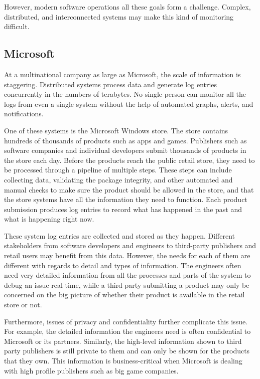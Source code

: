 \documentclass[english,12pt,a4paper,pdftex,sci,utf8]{aaltothesis}
\theoremstyle{definition}
\begin{document}
However, modern software operations all these goals form a challenge.
Complex, distributed, and interconnected systems may make this kind of monitoring difficult.

\subsection{Microsoft}
At a multinational company as large as Microsoft, the scale of information is staggering.
Distributed systems process data and generate log entries concurrently in the numbers of terabytes.
No single person can monitor all the logs from even a single system without the help of automated
graphs, alerts, and notifications.  

One of these systems is the Microsoft Windows store. The store contains hundreds of thousands of products
such as apps and games. Publishers such as software companies and individual developers submit thousands of 
products in the store each day. Before the products reach the public retail store, they need to be processed
through a pipeline of multiple steps. These steps can include collecting data, validating the package integrity, and
other automated and manual checks to make sure the product should be allowed in the store, 
and that the store systems have all the information they need to function.
Each product submission produces log entries to record what has happened in the past and what is happening right now.

These system log entries are collected and stored as they happen. 
Different stakeholders from software developers and engineers to third-party publishers and retail users 
may benefit from this data. However, the needs for each of them are
different with regards to detail and types of information.
The engineers often need very detailed information from all the processes and parts of the system to debug an issue real-time,
while a third party submitting a product may only be concerned on the big picture of whether their 
product is available in the retail store or not.

Furthermore, issues of privacy and confidentiality further complicate this issue.
For example, the detailed information the engineers need is often confidential to Microsoft or its partners.
Similarly, the high-level information shown to third party publishers is still private to them 
and can only be shown for the products that they own.
This information is business-critical when Microsoft is dealing with high profile publishers such as big game companies.
\end{document}

